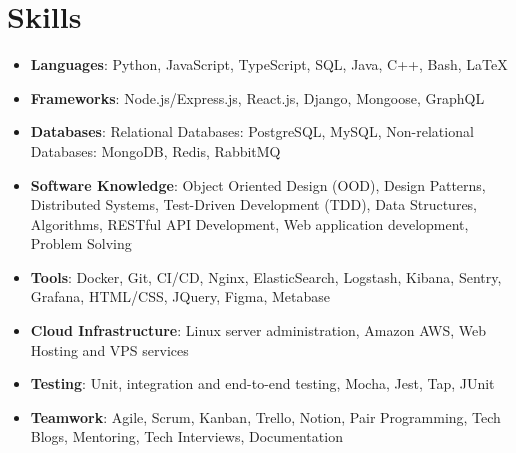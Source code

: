 \documentclass[letterpaper,10.8pt]{article}
\newcommand{\resumeItemWithTitle}[2]{
  \item\small{
    \textbf{#1}{: #2 \vspace{-4pt}}
  }
}
\newcommand{\resumeSubItem}[2]{\resumeItemWithTitle{#1}{#2}\vspace{-4pt}}
\newcommand{\resumeSubHeadingListStart}{\begin{itemize}[leftmargin=*]}
\newcommand{\resumeSubHeadingListEnd}{\end{itemize}}
\begin{document}

%
\section{Skills}
\resumeSubHeadingListStart
	\resumeItemWithTitle{Languages}{Python, JavaScript, TypeScript, SQL, Java, C++, Bash, LaTeX} 
    \resumeItemWithTitle{Frameworks}{Node.js/Express.js, React.js, Django, Mongoose, GraphQL} 
    \resumeItemWithTitle{Databases}{Relational Databases: PostgreSQL, MySQL, Non-relational Databases: MongoDB, Redis, RabbitMQ}
    \resumeItemWithTitle{Software Knowledge}{Object Oriented Design (OOD), Design Patterns, Distributed Systems, Test-Driven Development (TDD), Data Structures, Algorithms, RESTful API Development, Web application development, Problem Solving}
    \resumeItemWithTitle{Tools}{Docker, Git, CI/CD, Nginx, ElasticSearch, Logstash, Kibana, Sentry, Grafana, HTML/CSS, JQuery, Figma, Metabase}
    \resumeItemWithTitle{Cloud Infrastructure}{Linux server administration, Amazon AWS, Web Hosting and VPS services}
    \resumeItemWithTitle{Testing}{Unit, integration and end-to-end testing, Mocha, Jest, Tap, JUnit}
    \resumeItemWithTitle{Teamwork}{Agile, Scrum, Kanban, Trello, Notion, Pair Programming, Tech Blogs, Mentoring, Tech Interviews, Documentation}
\resumeSubHeadingListEnd
\end{document}
